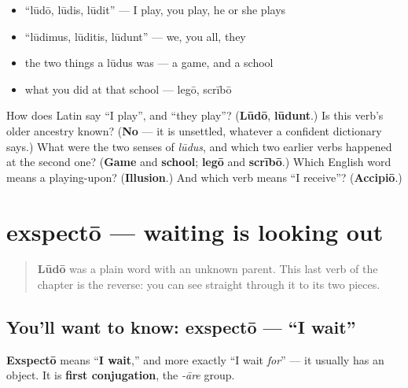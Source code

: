 \begin{itemize}
\raggedright
  \item \textquotedblleft{}lūdō, lūdis, lūdit\textquotedblright{} — I play, you play, he or she plays
  \item \textquotedblleft{}lūdimus, lūditis, lūdunt\textquotedblright{} — we, you all, they
  \item the two things a lūdus was — a game, and a school
  \item what you did at that school — legō, scrībō
\end{itemize}

\begin{tcolorbox}[breakable,colback=teal!4,colframe=teal!35!black,title={Before you move on}]
How does Latin say \textquotedblleft{}I play\textquotedblright{}, and \textquotedblleft{}they play\textquotedblright{}? (\textbf{Lūdō}, \textbf{lūdunt}.) Is this verb's older ancestry known? (\textbf{No} — it is unsettled, whatever a confident dictionary says.) What were the two senses of \emph{lūdus}, and which two earlier verbs happened at the second one? (\textbf{Game} and \textbf{school}; \textbf{legō} and \textbf{scrībō}.) Which English word means a playing-upon? (\textbf{Illusion}.) And which verb means \textquotedblleft{}I receive\textquotedblright{}? (\textbf{Accipiō}.)
\end{tcolorbox}
\section[exspectō, exspectāre]{exspectō — waiting is looking out}

\label{lesson:LA-C42-exspecto}



\begin{quote}
\textbf{Lūdō} was a plain word with an unknown parent. This last verb of the chapter is the reverse: you can see straight through it to its two pieces.
\end{quote}

\subsection*{You'll want to know: exspectō — \textquotedblleft{}I wait\textquotedblright{}}
\textbf{Exspectō} means \textquotedblleft{}\textbf{I wait},\textquotedblright{} and more exactly \textquotedblleft{}I wait \emph{for}\textquotedblright{} — it usually has an object. It is \textbf{first conjugation}, the \emph{-āre} group.

